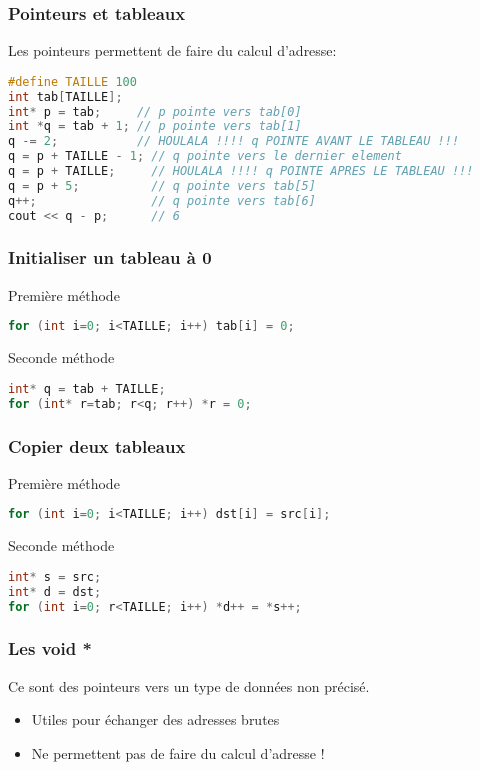\documentclass{beamer}
\begin{document}
\begin{frame}[fragile=singleslide,shrink=20]
\frametitle{Pointeurs et tableaux}
Les pointeurs permettent de faire du calcul d'adresse:
\begin{lstlisting}[language=c++]
#define TAILLE 100
int tab[TAILLE];
int* p = tab;     // p pointe vers tab[0]
int *q = tab + 1; // p pointe vers tab[1]
q -= 2;           // HOULALA !!!! q POINTE AVANT LE TABLEAU !!!
q = p + TAILLE - 1; // q pointe vers le dernier element
q = p + TAILLE;     // HOULALA !!!! q POINTE APRES LE TABLEAU !!!
q = p + 5;          // q pointe vers tab[5]
q++;                // q pointe vers tab[6]
cout << q - p;      // 6
\end{lstlisting}
\end{frame}

\begin{frame}[fragile=singleslide,shrink=20]
\frametitle{Initialiser un tableau à 0}
\begin{block}{Première méthode}
\begin{lstlisting}[language=c++]
for (int i=0; i<TAILLE; i++) tab[i] = 0;
\end{lstlisting}
\end{block}
\begin{block}{Seconde méthode}
\begin{lstlisting}[language=c++]
int* q = tab + TAILLE;
for (int* r=tab; r<q; r++) *r = 0;
\end{lstlisting}
\end{block}
\end{frame}

\begin{frame}[fragile=singleslide,shrink=20]
\frametitle{Copier deux tableaux}
\begin{block}{Première méthode}
\begin{lstlisting}[language=c++]
for (int i=0; i<TAILLE; i++) dst[i] = src[i];
\end{lstlisting}
\end{block}
\begin{block}{Seconde méthode}
\begin{lstlisting}[language=c++]
int* s = src;
int* d = dst;
for (int i=0; r<TAILLE; i++) *d++ = *s++;
\end{lstlisting}
\end{block}

\end{frame}

\begin{frame}[fragile=singleslide,shrink=20]
\frametitle{Les void *}
Ce sont des pointeurs vers un type de données non précisé.
\begin{itemize}
\item{Utiles pour échanger des adresses brutes}
\item{Ne permettent pas de faire du calcul d'adresse !}
\end{itemize}
\end{frame}
\end{document}
